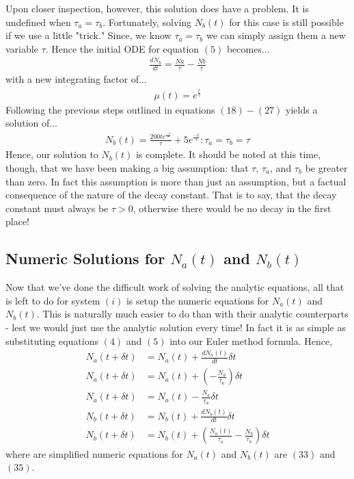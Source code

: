 \documentclass[twocolumn]{article}
\begin{document}
Upon closer inspection, however, this solution does have a problem. It is undefined when $\tau_a=\tau_b$. Fortunately, solving $N_b(t)$ for this case is still possible if we use a little "trick." Since, we know $\tau_a=\tau_b$ we can simply assign them a new variable $\tau$. Hence the initial ODE for equation $(5)$ becomes...
	\begin{align}
	\frac{dN_b}{dt}=\frac{Na}{\tau}-\frac{Nb}{\tau}
	\end{align}
with a new integrating factor of...
	\begin{align}
	\mu(t)=e^{\frac{t}{\tau	}}
	\end{align}
Following the previous steps outlined in equations $(18)-(27)$ yields a solution of...
	\begin{align}
	N_b(t)=\frac{200te^{\frac{-t}{\tau}}}{\tau}+5e^{\frac{-t}{\tau}}:\tau_a=\tau_b=\tau
	\end{align}
Hence, our solution to $N_b(t)$ is complete. It should be noted at this time, though, that we have been making a big assumption: that $\tau$, $\tau_a$, and $\tau_b$ be greater than zero. In fact this assumption is more than just an assumption, but a factual consequence of the nature of the decay constant. That is to say, that the decay constant must always be $\tau>0$, otherwise there would be no decay in the first place! 
\subsection{Numeric Solutions for $N_a(t)$ and $N_b(t)$}
\hspace{\parindent} Now that we've done the difficult work of solving the analytic equations, all that is left to do for system $(i)$ is setup the numeric equations for $N_a(t)$ and $N_b(t)$. This is naturally much easier to do than with their analytic counterparts - lest we would just use the analytic solution every time! In fact it is as simple as substituting equations $(4)$ and $(5)$ into our Euler method formula. Hence,
	\begin{align}
	N_a(t+\delta t)&=N_a(t)+\frac{dN_a(t)}{dt}\delta t\\
	N_a(t+\delta t)&=N_a(t)+\left(-\frac{N_a}{\tau_a}\right)\delta t\\
	N_a(t+\delta t)&=N_a(t)-\frac{N_a}{\tau_a}\delta t\\
	N_b(t+\delta t)&=N_b(t)+\frac{dN_b(t)}{dt}\delta t\\
	N_b(t+\delta t)&=N_b(t)+\left(\frac{N_a(t)}{\tau_a}-\frac{N_b}{\tau_b}\right)\delta t
	\end{align}	 
where are simplified numeric equations for $N_a(t)$ and $N_b(t)$ are $(33)$ and $(35)$.
\end{document}
